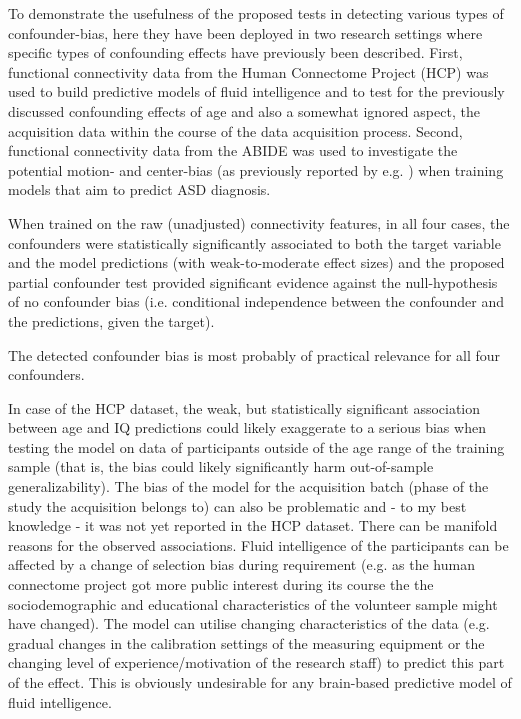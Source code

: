 \documentclass{article}
\begin{document}
To demonstrate the usefulness of the proposed tests in detecting various types of confounder-bias, here they have been deployed in two research settings where specific types of confounding effects have previously been described. 
First, functional connectivity data from the Human Connectome Project (HCP) \citep{van2013wu} was used to build predictive models of fluid intelligence and to test for the previously discussed confounding effects of age \cite{lohmann2021predicting, dubois2018distributed} and also a somewhat ignored aspect, the acquisition data within the course of the data acquisition process.
Second, functional connectivity data from the ABIDE \citep{di2014autism} was used to investigate the potential motion- and center-bias (as previously reported by e.g. \cite{spisak2014voxel, spisak2019optimal, gotts2013perils}) when training models that aim to predict ASD diagnosis.

When trained on the raw (unadjusted) connectivity features, in all four cases, the confounders were statistically significantly associated to both the target variable and the model predictions (with weak-to-moderate effect sizes) and the proposed partial confounder test provided significant evidence against the null-hypothesis of no confounder bias (i.e. conditional independence between the confounder and the predictions, given the target). 

The detected confounder bias is most probably of practical relevance for all four confounders. 


In case of the HCP dataset, the weak, but statistically significant association between age and IQ predictions could likely exaggerate to a serious bias when testing the model on data of participants outside of the age range of the training sample (that is, the bias could likely significantly harm out-of-sample generalizability). The bias of the model for the acquisition batch (phase of the study the acquisition belongs to) can also be problematic and - to my best knowledge - it was not yet reported in the HCP dataset. There can be manifold reasons for the observed associations. Fluid intelligence of the participants can be affected by a change of selection bias during requirement (e.g. as the human connectome project got more public interest during its course the the sociodemographic and educational characteristics of the volunteer sample might have changed). The model can utilise changing characteristics of the data (e.g. gradual changes in the calibration settings of the measuring equipment or the changing level of experience/motivation of the research staff) to predict this part of the effect. This is obviously undesirable for any brain-based predictive model of fluid intelligence.
\end{document}
